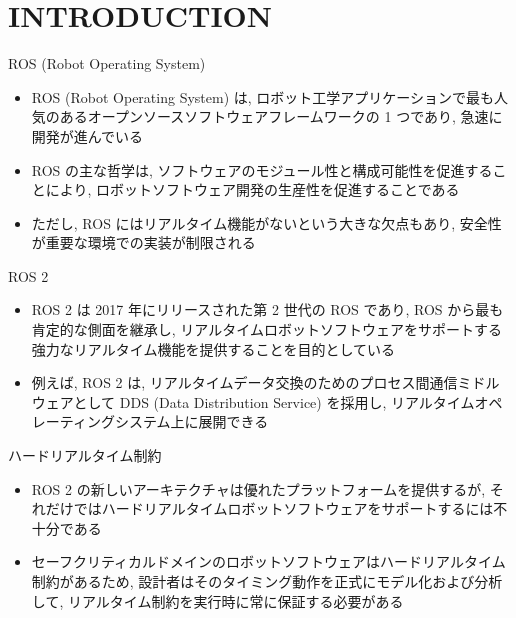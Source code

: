 
\section{INTRODUCTION}
\label{sec: introduction}

\begin{frame}{ROS (Robot Operating System)}
    \begin{itemize}
        \item ROS (Robot Operating System) は, ロボット工学アプリケーションで最も人気のあるオープンソースソフトウェアフレームワークの 1 つであり, 急速に開発が進んでいる
        \item ROS の主な哲学は, ソフトウェアのモジュール性と構成可能性を促進することにより, ロボットソフトウェア開発の生産性を促進することである
        \item ただし, ROS にはリアルタイム機能がないという大きな欠点もあり, 安全性が重要な環境での実装が制限される

    \end{itemize}
\end{frame}

\begin{frame}{ROS 2}
    \begin{itemize}
        \item ROS 2 は 2017 年にリリースされた第 2 世代の ROS であり, ROS から最も肯定的な側面を継承し, リアルタイムロボットソフトウェアをサポートする強力なリアルタイム機能を提供することを目的としている
        \item 例えば, ROS 2 は, リアルタイムデータ交換のためのプロセス間通信ミドルウェアとして DDS (Data Distribution Service) を採用し, リアルタイムオペレーティングシステム上に展開できる
    \end{itemize}
\end{frame}

\begin{frame}{ハードリアルタイム制約}
    \begin{itemize}
        \item ROS 2 の新しいアーキテクチャは優れたプラットフォームを提供するが, それだけではハードリアルタイムロボットソフトウェアをサポートするには不十分である
        \item セーフクリティカルドメインのロボットソフトウェアはハードリアルタイム制約があるため, 設計者はそのタイミング動作を正式にモデル化および分析して, リアルタイム制約を実行時に常に保証する必要がある
    \end{itemize}
\end{frame}

